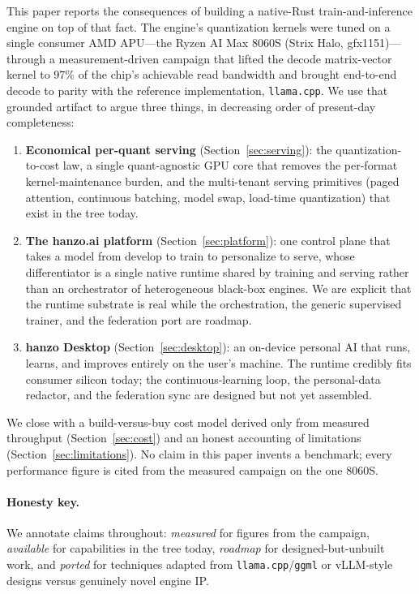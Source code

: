 \documentclass[11pt]{article}
\begin{document}
This paper reports the consequences of building a native-Rust train-and-inference engine on top of that fact. The engine's quantization kernels were tuned on a single consumer AMD APU---the Ryzen AI Max 8060S (Strix Halo, gfx1151)---through a measurement-driven campaign that lifted the decode matrix-vector kernel to 97\% of the chip's achievable read bandwidth and brought end-to-end decode to parity with the reference implementation, \texttt{llama.cpp}. We use that grounded artifact to argue three things, in decreasing order of present-day completeness:

\begin{enumerate}
\item \textbf{Economical per-quant serving} (Section~\ref{sec:serving}): the quantization-to-cost law, a single quant-agnostic GPU core that removes the per-format kernel-maintenance burden, and the multi-tenant serving primitives (paged attention, continuous batching, model swap, load-time quantization) that exist in the tree today.
\item \textbf{The hanzo.ai platform} (Section~\ref{sec:platform}): one control plane that takes a model from develop to train to personalize to serve, whose differentiator is a single native runtime shared by training and serving rather than an orchestrator of heterogeneous black-box engines. We are explicit that the runtime substrate is real while the orchestration, the generic supervised trainer, and the federation port are roadmap.
\item \textbf{hanzo Desktop} (Section~\ref{sec:desktop}): an on-device personal AI that runs, learns, and improves entirely on the user's machine. The runtime credibly fits consumer silicon today; the continuous-learning loop, the personal-data redactor, and the federation sync are designed but not yet assembled.
\end{enumerate}

We close with a build-versus-buy cost model derived only from measured throughput (Section~\ref{sec:cost}) and an honest accounting of limitations (Section~\ref{sec:limitations}). No claim in this paper invents a benchmark; every performance figure is cited from the measured campaign on the one 8060S.

\paragraph{Honesty key.} We annotate claims throughout: \emph{measured} for figures from the campaign, \emph{available} for capabilities in the tree today, \emph{roadmap} for designed-but-unbuilt work, and \emph{ported} for techniques adapted from \texttt{llama.cpp}/\texttt{ggml} or vLLM-style designs versus genuinely novel engine IP.
\end{document}
